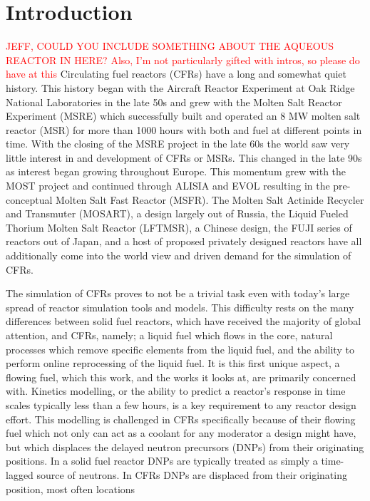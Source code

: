 \documentclass[review]{elsarticle}
\begin{document}
\section{Introduction} \label{sec:intro}
\textcolor{red}{JEFF, COULD YOU INCLUDE SOMETHING ABOUT THE AQUEOUS REACTOR IN HERE? Also, I'm not particularly gifted with intros, so please do have at this}
Circulating fuel reactors (CFRs) have a long and somewhat quiet history.
This history began with the Aircraft Reactor Experiment at Oak Ridge National
Laboratories in the late 50s and grew with the Molten Salt Reactor Experiment
(MSRE) which successfully built and operated an 8 MW molten salt reactor (MSR) for 
more than 1000 hours with both  and  fuel at different
points in time. With the closing of the MSRE project in the late 60s the world
saw very little interest in and development of CFRs or MSRs. This changed in
the late 90s as interest began growing throughout Europe. This momentum
grew with the MOST project and continued through ALISIA and EVOL resulting in
the pre-conceptual Molten Salt Fast Reactor (MSFR). The Molten Salt Actinide
Recycler and Transmuter (MOSART), a design largely out of Russia, the
Liquid Fueled Thorium Molten Salt Reactor (LFTMSR), a Chinese design, the
FUJI series of reactors out of Japan, and a host of proposed privately designed
reactors have all additionally come into the world view and driven demand for
the simulation of CFRs. 
\par The simulation of CFRs proves to not be a trivial task even with today's
large spread of reactor simulation tools and models. This difficulty rests on
the many differences between solid fuel reactors, which have received the
majority of global attention, and CFRs, namely; a liquid fuel which flows in
the core, natural processes which remove specific elements from the liquid fuel,
and the ability to perform online reprocessing of the liquid fuel. It is this
first unique aspect, a flowing fuel, which this work, and the works it looks at,
are primarily concerned with. Kinetics modelling, or the ability to predict
a reactor's response in time scales typically less than a few hours, is a key
requirement to any reactor design effort. This modelling is challenged in CFRs
specifically because of their flowing fuel which not only can act as a coolant
for any moderator a design might have, but which displaces the delayed
neutron precursors (DNPs) from their originating positions. In a solid fuel
reactor DNPs are typically treated as simply a time-lagged source of neutrons.
In CFRs DNPs are displaced from their originating position, most often locations
\end{document}
